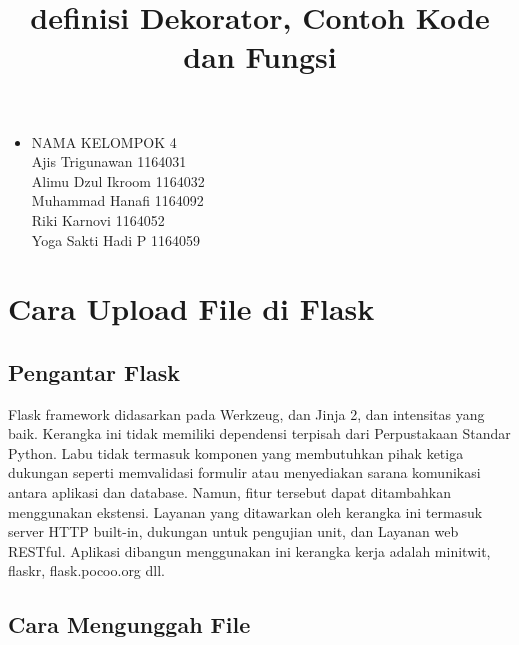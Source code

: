 \documentclass[12pt,a4paper]{article}
\begin{document}
\title{definisi Dekorator, Contoh Kode dan Fungsi}
\maketitle

\begin{itemize}

\item
NAMA KELOMPOK 4\\
Ajis Trigunawan			1164031\\
Alimu Dzul Ikroom		1164032\\
Muhammad Hanafi			1164092\\
Riki Karnovi			1164052\\
Yoga Sakti Hadi P		1164059\\

\end{itemize}

\section{Cara Upload File di Flask}

\subsection{Pengantar Flask}

Flask framework didasarkan pada Werkzeug, dan Jinja 2, dan intensitas yang baik. Kerangka ini tidak memiliki dependensi terpisah dari
Perpustakaan Standar Python. Labu tidak termasuk komponen yang membutuhkan pihak ketiga dukungan seperti memvalidasi formulir atau menyediakan sarana komunikasi antara aplikasi dan database. Namun, fitur tersebut dapat ditambahkan menggunakan ekstensi. Layanan yang ditawarkan oleh kerangka ini termasuk server HTTP built-in, dukungan untuk pengujian unit, dan Layanan web RESTful. Aplikasi dibangun menggunakan ini kerangka kerja adalah minitwit, flaskr, flask.pocoo.org dll.

\subsection{Cara Mengunggah File}
\end{document}
